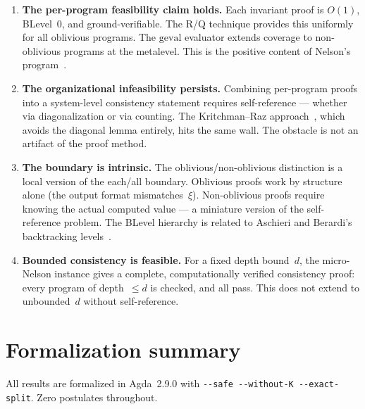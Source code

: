 \documentclass[11pt]{article}
\newcommand{\geval}{\mathrm{geval}}
\begin{document}
\begin{enumerate}
\item \textbf{The per-program feasibility claim holds.}
  Each invariant proof is $O(1)$, BLevel~$0$, and ground-verifiable.
  The R/Q technique provides this uniformly for all oblivious
  programs.
  The $\geval$ evaluator extends coverage to non-oblivious
  programs at the metalevel.
  This is the positive content of Nelson's program~\cite{nelson1986}.

\item \textbf{The organizational infeasibility persists.}
  Combining per-program proofs into a system-level consistency
  statement requires self-reference --- whether via diagonalization
  or via counting.
  The Kritchman--Raz approach~\cite{kritchmanraz2010}, which avoids
  the diagonal lemma entirely, hits the same wall.
  The obstacle is not an artifact of the proof method.

\item \textbf{The boundary is intrinsic.}
  The oblivious/non-oblivious distinction is a local
  version of the each/all boundary.
  Oblivious proofs work by structure alone (the output format
  mismatches~$\xi$).
  Non-oblivious proofs require knowing the actual computed value ---
  a miniature version of the self-reference problem.
  The BLevel hierarchy is related to Aschieri and Berardi's
  backtracking levels~\cite{aschieri2011}.

\item \textbf{Bounded consistency is feasible.}
  For a fixed depth bound~$d$, the micro-Nelson instance gives
  a complete, computationally verified consistency proof:
  every program of depth~$\le d$ is checked, and all pass.
  This does not extend to unbounded~$d$ without self-reference.
\end{enumerate}

\section{Formalization summary}

All results are formalized in Agda~2.9.0 with
\texttt{-{}-safe -{}-without-K -{}-exact-split}.
Zero postulates throughout.
\end{document}
